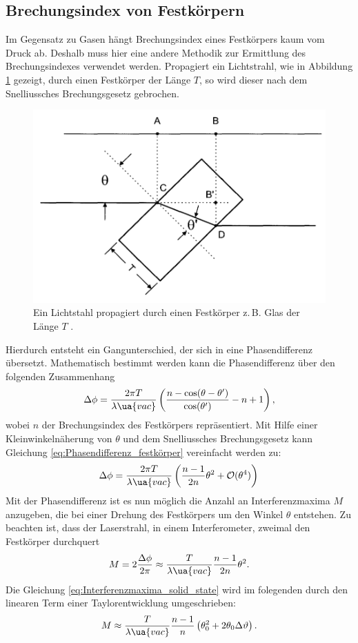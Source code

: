 \subsection{Brechungsindex von Festkörpern}
Im Gegensatz zu Gasen hängt Brechungsindex eines Festkörpers kaum vom Druck ab.
Deshalb muss hier eine andere Methodik zur Ermittlung des Brechungsindexes verwendet werden.
Propagiert ein Lichtstrahl, wie in Abbildung \ref{fig:slag} gezeigt, durch einen Festkörper der Länge $T$,
so wird dieser nach dem Snelliussches Brechungsgesetz gebrochen.
\begin{figure}
\centering
\includegraphics[width=0.6\linewidth]{./content/images/slab.png}
\caption{Ein Lichtstahl propagiert durch einen Festkörper z.\,B. Glas der Länge $T$ \cite{anleitung64}.}
\label{fig:slag}
\end{figure}
Hierdurch entsteht ein Gangunterschied, der sich in eine Phasendifferenz übersetzt.
Mathematisch bestimmt werden kann die Phasendifferenz über den folgenden Zusammenhang
\begin{equation}
  \label{eq:Phasendifferenz_festkörper}
  \Delta\phi=\frac{ 2\pi T }{ \lambda\ua{vac} }\left( \frac{ n-\cos(\theta-\theta') }{ \cos(\theta') } - n+1\right),
\end{equation}
wobei $n$ der Brechungsindex des Festkörpers repräsentiert.
Mit Hilfe einer Kleinwinkelnäherung von $\theta$ und dem Snelliussches Brechungsgesetz kann
Gleichung \eqref{eq:Phasendifferenz_festkörper} vereinfacht werden zu:
\begin{equation}
  \Delta\phi=\frac{ 2\pi T }{ \lambda\ua{vac} }\left( \frac{ n-1 }{ 2n }\theta^2 + \mathcal{O}(\theta^4)\right)
\end{equation}
Mit der Phasendifferenz ist es nun möglich die Anzahl an Interferenzmaxima $M$ anzugeben, die bei einer Drehung
des Festkörpers um den Winkel $\theta$ entstehen. Zu beachten ist, dass der Laserstrahl, in einem Interferometer, zweimal den Festkörper durchquert
\begin{equation}
  \label{eq:Interferenzmaxima_solid_state}
  M=2\frac{\Delta\phi}{2\pi}\approx \frac{T}{\lambda\ua{vac}}\frac{n-1}{2n}\theta^2.
\end{equation}
Die Gleichung \eqref{eq:Interferenzmaxima_solid_state} wird im folegenden
durch den linearen Term einer Taylorentwicklung umgeschrieben:
\begin{equation}
\label{eq:entwicklung_interferenzmaxima}
  M\approx\frac{T}{\lambda\ua{vac}}\frac{n-1}{n}\left(\theta_0^2 + 2\theta_0 \Delta \vartheta \right).
\end{equation}


